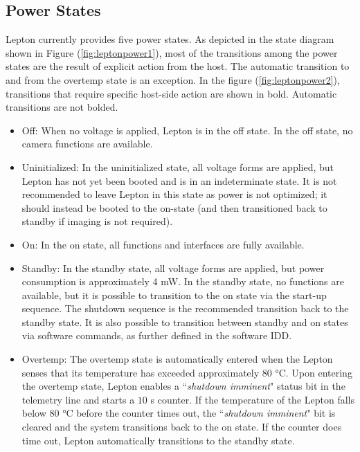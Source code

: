 \subsection{Power States}
\label{ssec:powerstate}
Lepton currently provides five power states. As depicted in the state diagram
shown in Figure (\ref{fig:leptonpower1}), most of the transitions among the power 
states are the result of explicit action from the host. 
The automatic transition to and from the overtemp state is an exception. 
In the figure (\ref{fig:leptonpower2}), transitions that require specific
host-side action are shown in bold. Automatic transitions are not bolded.
%
\begin{itemize} \item Off: When no voltage is applied, Lepton is in the off
state. In the off state, no camera functions are available. \item Uninitialized:
In the uninitialized state, all voltage forms are applied, but Lepton has not
yet been booted and is in an indeterminate state. It is not recommended to leave
Lepton in this state as power is not optimized; it should instead be booted to
the on-state (and then transitioned back to standby if imaging is not required).
\item On: In the on state, all functions and interfaces are fully available.
\item Standby: In the standby state, all voltage forms are applied, but power
consumption is approximately 4 \si{\milli\watt}. In the standby state, no
functions are available, but it is possible to transition to the on state via
the start-up sequence. The shutdown sequence is the recommended transition back
to the standby state. It is also possible to transition between standby and on
states via software commands, as further defined in the software IDD. \item
Overtemp: The overtemp state is automatically entered when the Lepton senses
that its temperature has exceeded approximately $80$ \si{\celsius}. Upon
entering the overtemp state, Lepton enables a ``\emph{shutdown imminent}" status
bit in the telemetry line and starts a $10$ \si{\second} counter. If the
temperature of the Lepton falls below $80$ \si{\celsius} before the counter
times out, the ``\emph{shutdown imminent}" bit is cleared and the system
transitions back to the on state. If the counter does time out, Lepton
automatically transitions to the standby state. 
\end{itemize}
%
\begin{figure}[htb]
    \centering
     \quad
    \label{fig:leptonpower}
\end{figure}
%
%
